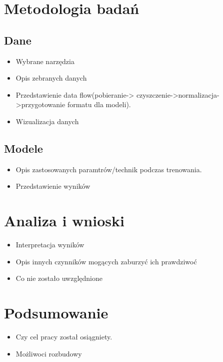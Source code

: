 \chapter{Metodologia badań}
\label{cha:pierwszyDokument}

\section{Dane}
\label{cha:pierwszyDokument}

\begin{itemize}
\item Wybrane narzędzia
\item Opis zebranych danych
\item Przedstawienie data flow(pobieranie-> czyszczenie->normalizacja->przygotowanie formatu dla modeli).
\item Wizualizacja danych
\end{itemize}


\section{Modele }
\label{cha:pierwszyDokument}

\begin{itemize}
\item Opis zastosowanych paramtrów/technik podczas trenowania.
\item Przedstawienie wyników 
\end{itemize}


\chapter{Analiza i wnioski }
\label{cha:pierwszyDokument}

\begin{itemize}
\item Interpretacja wyników
\item Opis innych czynników mogących zaburzyć ich prawdziwoć
\item Co nie zostało uwzględnione 
\end{itemize}


\chapter{Podsumowanie}
\label{cha:pierwszyDokument}

\begin{itemize}
\item Czy cel pracy został osiągniety.
\item Możliwoci rozbudowy
\end{itemize}





